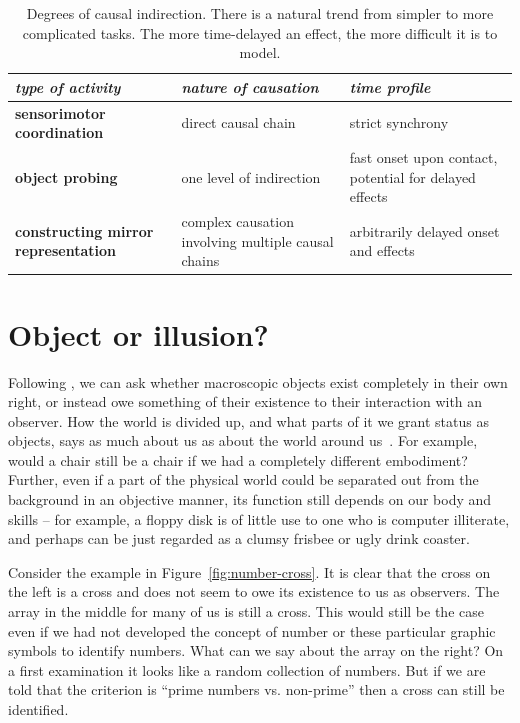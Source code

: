\begin{table}[htbp]
\begin{center}
\begin{tabular}{|p{5.2cm}|p{4.5cm}|p{4.5cm}|}
\hline
{\it type of activity} & {\it nature of causation} &  {\it time profile} \\ \hline\hline
{\bf sensorimotor coordination} & direct causal chain & strict synchrony \\ \hline
{\bf object probing} & one level of indirection & fast onset upon contact, potential for delayed effects\\ \hline
{\bf constructing mirror representation} &  complex causation involving multiple causal chains & arbitrarily delayed onset and effects\\ \hline
\end{tabular}
\caption{
\label{tab:causation}
%
Degrees of causal indirection. There is a natural
trend from simpler to more complicated tasks.  The more time-delayed
an effect, the more difficult it is to model.
%
}
\end{center}
\end{table}

\section{Object or illusion?}

Following \cite{manzotti01coscienza}, we can ask whether macroscopic
objects exist completely in their own right, or instead owe something
of their existence to their interaction with an observer.  
How the world is divided up, and what parts of it we grant status
as objects, says as much about us as about the world around 
us~\cite{hendriksjansen96catching}.
%
%
For example, would a chair still be a chair if we had a completely different
embodiment? Further, even if a part of the physical world could be
separated out from the background in an objective manner, its function still depends on our
body and skills -- for example, a floppy disk is of
little use to one who is computer illiterate, and perhaps can be just regarded as
a clumsy frisbee or ugly drink coaster.

Consider the example in Figure~\ref{fig:number-cross}. It is
clear that the cross on the left is a cross and does not seem to owe 
its existence to us as observers. The array in the middle for
many of us is still a cross. This would still be the case 
even if we had not developed the concept of number or these particular
graphic symbols to identify numbers. What can we say about the array 
on the right? On a first examination it looks like a random collection
of numbers. But if we are told that the criterion is ``prime numbers 
vs. non-prime'' then a cross can still be identified.

